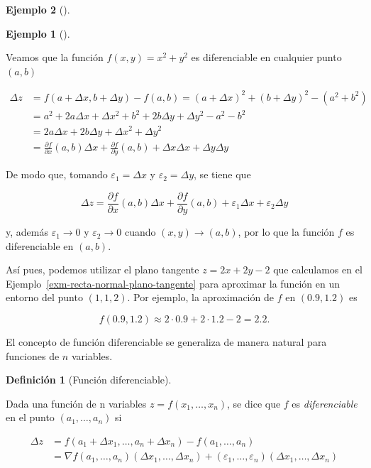 \documentclass[
  a4paper,
]{scrreport}
\theoremstyle{definition}
\newtheorem{example}{Ejemplo}[chapter]
\theoremstyle{plain}
\theoremstyle{definition}
\newtheorem{definition}{Definición}[chapter]
\theoremstyle{definition}
\theoremstyle{plain}
\theoremstyle{plain}
\theoremstyle{remark}
\begin{document}
\begin{example}[]
\begin{example}[]\protect\hypertarget{exm-aproximacion-funcion-dos-variables-plano-tangente}{}\label{exm-aproximacion-funcion-dos-variables-plano-tangente}

Veamos que la función \(f(x,y)=x^2 + y^2\) es diferenciable en cualquier
punto \((a,b)\)

\begin{align*}
\Delta z 
&= f(a+\Delta x, b+\Delta y) - f(a,b) 
= (a+\Delta x)^2 + (b+\Delta y)^2 - (a^2 + b^2) \\
&= a^2 + 2a\Delta x + \Delta x^2 + b^2 + 2b\Delta y + \Delta y^2 - a^2 - b^2\\
&= 2a\Delta x + 2b\Delta y + \Delta x^2 + \Delta y^2 \\
&= \frac{\partial f}{\partial x}(a,b) \Delta x + \frac{\partial f}{\partial y}(a,b) + \Delta x \Delta x + \Delta y \Delta y
\end{align*}

De modo que, tomando \(\varepsilon_1 = \Delta x\) y
\(\varepsilon_2 = \Delta y\), se tiene que

\[
\Delta z = \frac{\partial f}{\partial x}(a,b) \Delta x + \frac{\partial f}{\partial y}(a,b) + \varepsilon_1 \Delta x + \varepsilon_2 \Delta y
\]

y, además \(\varepsilon_1\to 0\) y \(\varepsilon_2\to 0\) cuando
\((x,y)\to (a,b)\), por lo que la función \(f\) es diferenciable en
\((a,b)\).

Así pues, podemos utilizar el plano tangente \(z = 2x+2y-2\) que
calculamos en el Ejemplo~\ref{exm-recta-normal-plano-tangente} para
aproximar la función en un entorno del punto \((1, 1, 2)\). Por ejemplo,
la aproximación de \(f\) en \((0.9, 1.2)\) es

\[
f(0.9, 1.2) \approx 2\cdot 0.9 + 2\cdot 1.2 - 2 = 2.2.
\]

\end{example}

El concepto de función diferenciable se generaliza de manera natural
para funciones de \(n\) variables.

\begin{definition}[Función
diferenciable]\protect\hypertarget{def-funcion-varias-variables-diferenciable}{}\label{def-funcion-varias-variables-diferenciable}

Dada una función de n variables \(z=f(x_1,\ldots,x_n)\), se dice que
\(f\) es \emph{diferenciable} en el punto \((a_1,\ldots,a_n)\) si

\begin{align*}
\Delta z 
&= f(a_1+\Delta x_1, \ldots, a_n+\Delta x_n) - f(a_1,\ldots,a_n) \\
&= \nabla f(a_1,\ldots,a_n) (\Delta x_1,\ldots, \Delta x_n) + (\varepsilon_1,\ldots, \varepsilon_n)(\Delta x_1,\ldots, \Delta x_n)
\end{align*}


\end{definition}
\end{example}
\end{document}
